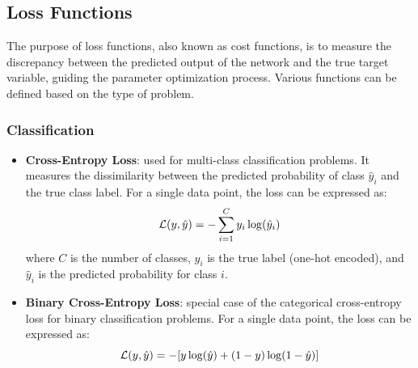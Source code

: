 \subsection{Loss Functions}
The purpose of loss functions, also known as cost functions, is to measure the discrepancy between the predicted output of the network and the true target variable, guiding the parameter optimization process.
Various functions can be defined based on the type of problem.

\subsubsection{Classification}
\begin{itemize}
    \item \textbf{Cross-Entropy Loss}: used for multi-class classification problems. 
    It measures the dissimilarity between the predicted probability of class $\hat{y}_i$ and the true class label.
    For a single data point, the loss can be expressed as:
    \begin{equation*}
        \mathcal{L}(y, \hat{y}) = -\sum_{i=1}^{C} y_i \log(\hat{y}_i)
    \end{equation*}
    where $C$ is the number of classes, $y_i$ is the true label (one-hot encoded), and $\hat{y}_i$ is the predicted probability for class $i$.
    
    \item \textbf{Binary Cross-Entropy Loss}: special case of the categorical cross-entropy loss for binary classification problems.
    For a single data point, the loss can be expressed as:
    \begin{equation*}
        \mathcal{L}(y, \hat{y}) = -[y \log(\hat{y}) + (1 - y) \log(1 - \hat{y})]
    \end{equation*}
\end{itemize}

